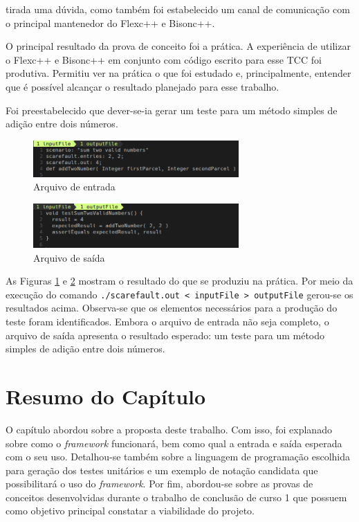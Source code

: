 tirada uma dúvida, como também foi estabelecido um canal de comunicação com o
principal mantenedor do Flexc++ e Bisonc++.
\par
\indent O principal resultado da prova de conceito foi a prática. A experiência
de utilizar o Flexc++ e Bisonc++ em conjunto com código escrito para esse TCC
foi produtiva. Permitiu ver na prática o que foi estudado e, principalmente,
entender que é possível alcançar o resultado planejado para esse trabalho.
\par
\indent Foi preestabelecido que dever-se-ia gerar um teste para um método
simples de adição entre dois números.
\par
\begin{figure}[h]
    \centering
    \includegraphics[width=0.7\textwidth]{figuras/inputFile.png}
    \caption{Arquivo de entrada}
    \label{fig:inputfile}
 \end{figure}
 \par
 \begin{figure}[h]
    \centering
    \includegraphics[width=0.7\textwidth]{figuras/outputFile.png}
    \caption{Arquivo de saída}
    \label{fig:outputfile}
 \end{figure}
 \par
 \indent As Figuras \ref{fig:inputfile} e \ref{fig:outputfile} mostram o resultado
 do que se produziu na prática. Por meio da execução do comando
 \lstinline|./scarefault.out < inputFile > outputFile| gerou-se os resultados
 acima. Observa-se que os elementos necessários para a produção do teste foram
 identificados. Embora o arquivo de entrada não seja completo, o arquivo de saída
 apresenta o resultado esperado: um teste para um método simples de adição entre
 dois números.
\section{Resumo do Capítulo}
O capítulo abordou sobre a proposta deste trabalho. Com isso, foi explanado sobre
como o \textit{framework} funcionará, bem como qual a entrada e saída esperada
com o seu uso. Detalhou-se também sobre a linguagem de programação escolhida para
geração dos testes unitários e um exemplo de notação candidata que possibilitará
o uso do \textit{framework}. Por fim, abordou-se sobre as provas de conceitos
desenvolvidas durante o trabalho de conclusão de curso 1 que possuem como objetivo
principal constatar a viabilidade do projeto.
